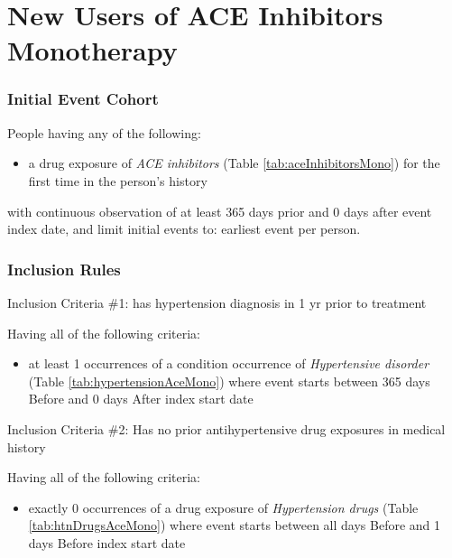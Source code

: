 \documentclass[10.5pt]{book}
\providecommand{\tightlist}{%
  \setlength{\itemsep}{0pt}\setlength{\parskip}{0pt}}
\theoremstyle{definition}
\theoremstyle{definition}
\theoremstyle{definition}
\theoremstyle{remark}
\begin{document}
\section{New Users of ACE Inhibitors
Monotherapy}\label{AceInhibitorsMono}

\subsubsection*{Initial Event Cohort}\label{initial-event-cohort-1}

People having any of the following:

\begin{itemize}
\tightlist
\item
  a drug exposure of \emph{ACE inhibitors} (Table
  \ref{tab:aceInhibitorsMono}) for the first time in the person's
  history
\end{itemize}

with continuous observation of at least 365 days prior and 0 days after
event index date, and limit initial events to: earliest event per
person.

\subsubsection*{Inclusion Rules}\label{inclusion-rules}

Inclusion Criteria \#1: has hypertension diagnosis in 1 yr prior to
treatment

Having all of the following criteria:

\begin{itemize}
\tightlist
\item
  at least 1 occurrences of a condition occurrence of \emph{Hypertensive
  disorder} (Table \ref{tab:hypertensionAceMono}) where event starts
  between 365 days Before and 0 days After index start date
\end{itemize}

Inclusion Criteria \#2: Has no prior antihypertensive drug exposures in
medical history

Having all of the following criteria:

\begin{itemize}
\tightlist
\item
  exactly 0 occurrences of a drug exposure of \emph{Hypertension drugs}
  (Table \ref{tab:htnDrugsAceMono}) where event starts between all days
  Before and 1 days Before index start date
\end{itemize}
\end{document}
